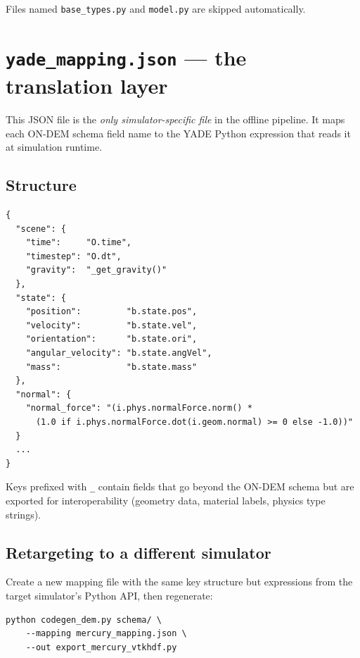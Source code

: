 \documentclass[11pt,a4paper]{article}
\begin{document}
Files named \texttt{base\_types.py} and \texttt{model.py} are skipped
automatically.

\section{\texttt{yade\_mapping.json} --- the translation layer}
\label{sec:mapping}

This JSON file is the \emph{only simulator-specific file} in the offline
pipeline. It maps each ON-DEM schema field name to the YADE Python expression
that reads it at simulation runtime.

\subsection{Structure}

\begin{lstlisting}[language={}]
{
  "scene": {
    "time":     "O.time",
    "timestep": "O.dt",
    "gravity":  "_get_gravity()"
  },
  "state": {
    "position":         "b.state.pos",
    "velocity":         "b.state.vel",
    "orientation":      "b.state.ori",
    "angular_velocity": "b.state.angVel",
    "mass":             "b.state.mass"
  },
  "normal": {
    "normal_force": "(i.phys.normalForce.norm() *
      (1.0 if i.phys.normalForce.dot(i.geom.normal) >= 0 else -1.0))"
  }
  ...
}
\end{lstlisting}

Keys prefixed with \texttt{\_} contain fields that go beyond the ON-DEM
schema but are exported for interoperability (geometry data, material labels,
physics type strings).

\subsection{Retargeting to a different simulator}

Create a new mapping file with the same key structure but expressions from
the target simulator's Python API, then regenerate:

\begin{lstlisting}[style=bash]
python codegen_dem.py schema/ \
    --mapping mercury_mapping.json \
    --out export_mercury_vtkhdf.py
\end{lstlisting}

\end{document}
